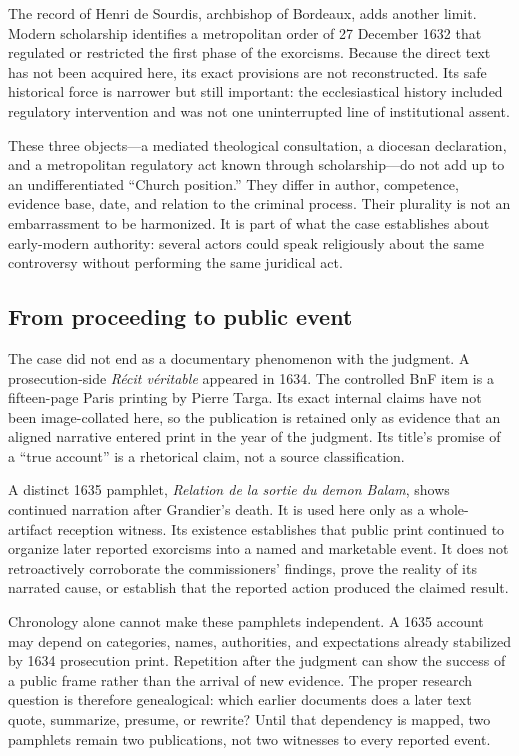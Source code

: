 The record of Henri de Sourdis, archbishop of Bordeaux, adds another limit.
Modern scholarship identifies a metropolitan order of 27 December 1632 that
regulated or restricted the first phase of the exorcisms.  Because the direct
text has not been acquired here, its exact provisions are not reconstructed.
Its safe historical force is narrower but still important: the ecclesiastical
history included regulatory intervention and was not one uninterrupted line
of institutional assent.

These three objects---a mediated theological consultation, a diocesan
declaration, and a metropolitan regulatory act known through scholarship---do
not add up to an undifferentiated ``Church position.''  They differ in author,
competence, evidence base, date, and relation to the criminal process.  Their
plurality is not an embarrassment to be harmonized.  It is part of what the
case establishes about early-modern authority: several actors could speak
religiously about the same controversy without performing the same juridical
act.

\subsection{From proceeding to public event}

The case did not end as a documentary phenomenon with the judgment.  A
prosecution-side \emph{Récit véritable} appeared in 1634.  The controlled BnF
item is a fifteen-page Paris printing by Pierre Targa.  Its exact internal
claims have not been image-collated here, so the publication is retained only
as evidence that an aligned narrative entered print in the year of the
judgment.  Its title's promise of a ``true account'' is a rhetorical claim,
not a source classification.

A distinct 1635 pamphlet, \emph{Relation de la sortie du demon Balam}, shows
continued narration after Grandier's death.  It is used here only as a
whole-artifact reception witness.  Its existence establishes that public
print continued to organize later reported exorcisms into a named and
marketable event.  It does not retroactively corroborate the commissioners'
findings, prove the reality of its narrated cause, or establish that the
reported action produced the claimed result.

Chronology alone cannot make these pamphlets independent.  A 1635 account may
depend on categories, names, authorities, and expectations already stabilized
by 1634 prosecution print.  Repetition after the judgment can show the success
of a public frame rather than the arrival of new evidence.  The proper
research question is therefore genealogical: which earlier documents does a
later text quote, summarize, presume, or rewrite?  Until that dependency is
mapped, two pamphlets remain two publications, not two witnesses to every
reported event.

